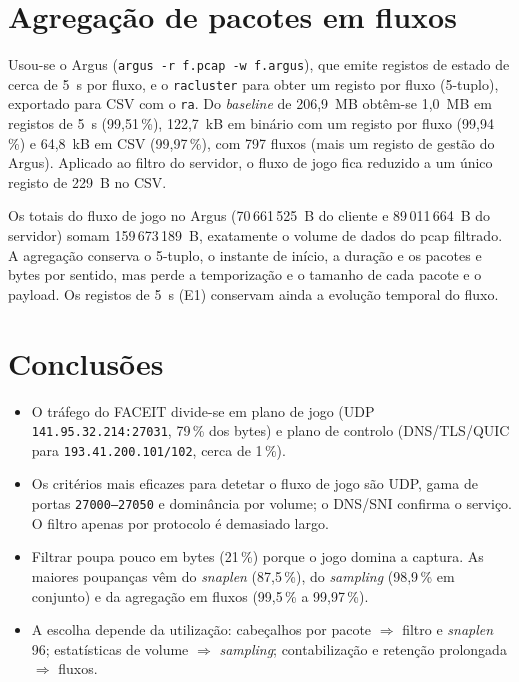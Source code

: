 \documentclass[a4paper,11pt]{article}
\begin{document}
\section{Agregação de pacotes em fluxos}
Usou-se o Argus (\texttt{argus -r f.pcap -w f.argus}), que emite registos de estado de cerca de 5~s por fluxo, e o
\texttt{racluster} para obter um registo por fluxo (5-tuplo), exportado para CSV com o \texttt{ra}. Do \emph{baseline}
de 206,9~MB obtêm-se 1,0~MB em registos de 5~s (99,51\,\%), 122,7~kB em binário com um registo por fluxo (99,94\,\%)
e 64,8~kB em CSV (99,97\,\%), com 797 fluxos (mais um registo de gestão do Argus). Aplicado ao filtro do servidor, o fluxo
de jogo fica reduzido a um único registo de 229~B no CSV.

Os totais do fluxo de jogo no Argus (70\,661\,525~B do cliente e 89\,011\,664~B do servidor) somam
159\,673\,189~B, exatamente o volume de dados do pcap filtrado. A agregação conserva o 5-tuplo, o instante de início,
a duração e os pacotes e bytes por sentido, mas perde a temporização e o tamanho de cada pacote e o payload. Os registos de
5~s (E1) conservam ainda a evolução temporal do fluxo.

\section{Conclusões}
\begin{itemize}
  \item O tráfego do FACEIT divide-se em plano de jogo (UDP \texttt{141.95.32.214:27031}, 79\,\% dos bytes) e plano de controlo
        (DNS/TLS/QUIC para \texttt{193.41.200.101/102}, cerca de 1\,\%).
  \item Os critérios mais eficazes para detetar o fluxo de jogo são UDP, gama de portas \texttt{27000--27050} e dominância por
        volume; o DNS/SNI confirma o serviço. O filtro apenas por protocolo é demasiado largo.
  \item Filtrar poupa pouco em bytes (21\,\%) porque o jogo domina a captura. As maiores poupanças vêm do \emph{snaplen}
        (87,5\,\%), do \emph{sampling} (98,9\,\% em conjunto) e da agregação em fluxos (99,5\,\% a 99,97\,\%).
  \item A escolha depende da utilização: cabeçalhos por pacote $\Rightarrow$ filtro e \emph{snaplen} 96; estatísticas de volume
        $\Rightarrow$ \emph{sampling}; contabilização e retenção prolongada $\Rightarrow$ fluxos.
\end{itemize}
\end{document}
